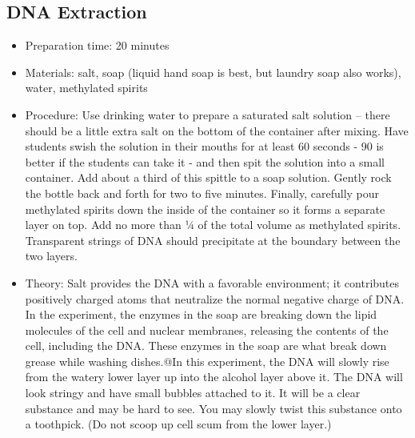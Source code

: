 \subsection{DNA Extraction}
\begin{itemize}
\item{Preparation time: 20 minutes}
\item{Materials: salt, soap (liquid hand soap is best, but laundry soap also works), water, methylated spirits}
\item{Procedure: Use drinking water to prepare a saturated salt solution – there should be a little extra salt on the bottom of the container after mixing. Have students swish the solution in their mouths for at least 60 seconds - 90 is better if the students can take it - and then spit the solution into a small container. Add about a third of this spittle to a soap solution. Gently rock the bottle back and forth for two to five minutes. Finally, carefully pour methylated spirits down the inside of the container so it forms a separate layer on top. Add no more than ¼ of the total volume as methylated spirits. Transparent strings of DNA should precipitate at the boundary between the two layers.}
\item{Theory: Salt provides the DNA with a favorable environment; it contributes positively charged atoms that neutralize the normal negative charge of DNA. In the experiment, the enzymes in the soap are breaking down the lipid molecules of the cell and nuclear membranes, releasing the contents of the cell, including the DNA. These enzymes in the soap are what break down grease while washing dishes.@In this experiment, the DNA will slowly rise from the watery lower layer up into the alcohol layer above it. The DNA will look stringy and have small bubbles attached to it. It will be a clear substance and may be hard to see. You may slowly twist this substance onto a toothpick. (Do not scoop up cell scum from the lower layer.)}
\end{itemize}

